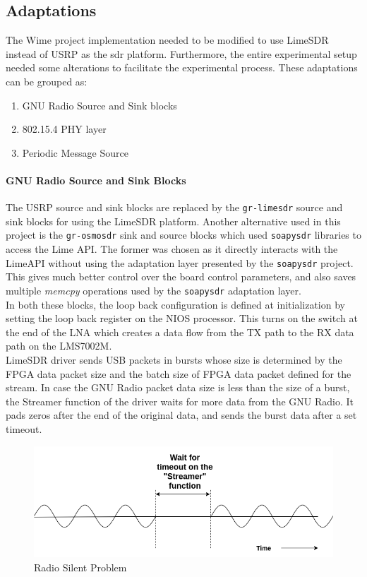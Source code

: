 \subsection{Adaptations}
The Wime project implementation needed to be modified to use LimeSDR instead of USRP as the \ac{sdr} platform.
Furthermore, the entire experimental setup needed some alterations to facilitate the experimental process.
These adaptations can be grouped as:

\begin{enumerate}
\item{GNU Radio Source and Sink blocks}
\item{802.15.4 \ac{PHY} layer}
\item{Periodic Message Source}
\end{enumerate}

\paragraph{GNU Radio Source and Sink Blocks}
The USRP source and sink blocks are replaced by the \texttt{gr-limesdr} source and sink blocks for using the LimeSDR platform.
Another alternative used in this project is the \texttt{gr-osmosdr} sink and source blocks which used \texttt{soapysdr} libraries to access the Lime API.
The former was chosen as it directly interacts with the LimeAPI without using the adaptation layer presented by the \texttt{soapysdr} project. This gives much better control over the board control parameters, and also saves multiple \textit{memcpy} operations used by the \texttt{soapysdr} adaptation layer.\\

In both these blocks, the loop back configuration is defined at initialization by setting the loop back register on the NIOS processor.
This turns on the switch at the end of the \ac{LNA} which creates a data flow from the TX path to the RX data path on the LMS7002M.\\


LimeSDR driver sends USB packets in bursts whose size is determined by the FPGA data packet size and the batch size of FPGA data packet defined for the stream.
In case the GNU Radio packet data size is less than the size of a burst, the Streamer function of the driver waits for more data from the GNU Radio.
It pads zeros after the end of the original data, and sends the burst data after a set timeout.\\

\begin{figure}[h!]
\centering
\includegraphics[scale=0.6]{Thesis/Figure/SilentProblem.png}
\caption{Radio Silent Problem}
\label{Radio_Silent}
\end{figure}


